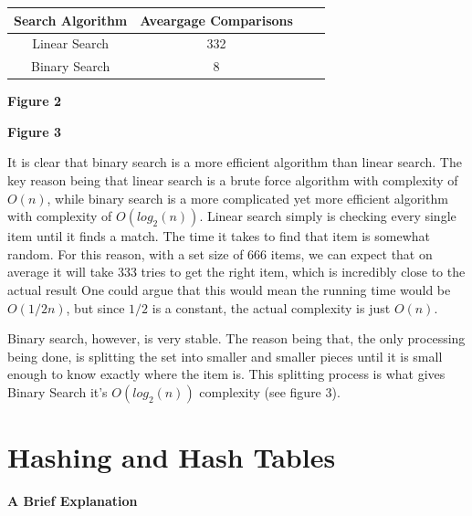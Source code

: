 \documentclass[letterpaper, 10pt]{article}
\begin{document}
\begin{center}
{
 \begin{tabular}{||c c c c||} 
 \hline
 Search Algorithm & Aveargage Comparisons \\ [0.5ex] 
 \hline\hline
 Linear Search& 332 \\ 
 \hline
 Binary Search& 8 \\
 \hline
\end{tabular}
}
\textbf{Figure 2}
\end{center}
\begin{center}
\textbf{Figure 3}
\end{center}




It is clear that binary search is a more efficient algorithm than linear search. The key reason being that linear search is a brute force algorithm with complexity of $O(n)$, while binary search is a more complicated yet more efficient algorithm with complexity of $O(log_2(n))$. Linear search simply is checking every single item until it finds a match. The time it takes to find that item is somewhat random. For this reason, with a set size of 666 items, we can expect that on average it will take 333 tries  to get the right item, which is incredibly close to the actual result One could argue that this would mean the running time would be $O(1/2n)$, but since $1/2$ is a constant, the actual complexity is just $O(n)$.

Binary search, however, is very stable. The reason being that, the only processing being done, is splitting the set into smaller and smaller pieces until it is small enough to know exactly where the item is. This splitting process is what gives Binary Search it's $O(log_2(n))$ complexity (see figure 3). 

\section{Hashing and Hash Tables}
\begin{center}
\textbf{ A Brief Explanation}
\end{center}
\end{document}
